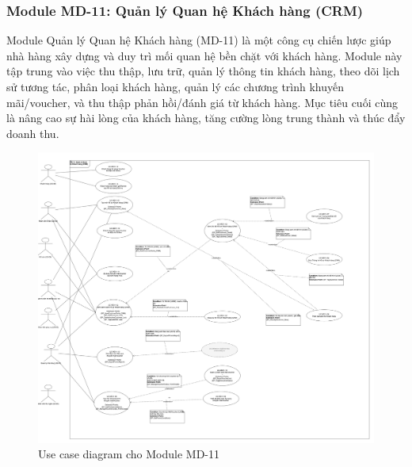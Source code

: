 
\subsubsection{Module MD-11: Quản lý Quan hệ Khách hàng (CRM)}
Module Quản lý Quan hệ Khách hàng (MD-11) là một công cụ chiến lược giúp nhà hàng xây dựng và duy trì mối quan hệ bền chặt với khách hàng. Module này tập trung vào việc thu thập, lưu trữ, quản lý thông tin khách hàng, theo dõi lịch sử tương tác, phân loại khách hàng, quản lý các chương trình khuyến mãi/voucher, và thu thập phản hồi/đánh giá từ khách hàng. Mục tiêu cuối cùng là nâng cao sự hài lòng của khách hàng, tăng cường lòng trung thành và thúc đẩy doanh thu.



\begin{figure}[H]
    \centering
    \includegraphics[width=15cm]{Sections/tong_quan/functional_spec/img/uc11.png}
    \vspace{0.5cm}
    \caption{Use case diagram cho Module MD-11}
    \label{fig:my_label}
\end{figure}

